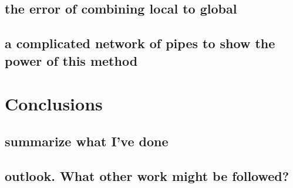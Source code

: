 \documentclass[10pt,twocolumn]{article}
\newtheorem[L]{thm}{Theorem}[section]
\begin{document}
\subsection{the error of combining local to global}
\subsection{a complicated network of pipes to show the power of this method}

\section{Conclusions\label{sec:conclusions}}

\subsection{summarize what I've done}
\subsection{outlook. What other work might be followed?}


\end{document}

